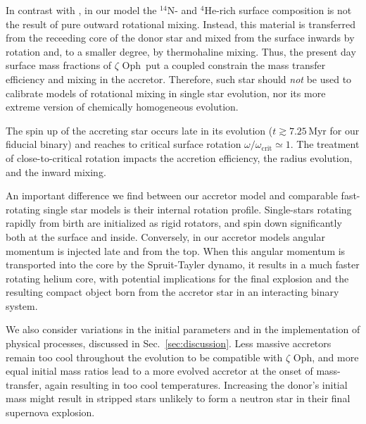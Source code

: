 \documentclass[twocolumn,twocolappendix,trackchanges]{aastex63}
\DeclareRobustCommand{\Secref}[1]{Sec.~\ref{#1}}
\newcommand{\zoph}{$\zeta$ Oph}
\begin{document}
In contrast with \cite{vanrensbergen:96}, in our model the
$^{14}\mathrm{N}$- and $^4\mathrm{He}$-rich surface composition is not
the result of pure outward rotational mixing.  Instead, this material
is transferred from the receeding core of the donor star and mixed
from the surface inwards by rotation and, to a smaller degree, by
thermohaline mixing.  Thus, the present day surface mass fractions of
\zoph\ put a coupled constrain the mass transfer efficiency and mixing
in the accretor. Therefore, such star should \emph{not} be used to
calibrate models of rotational mixing in single star evolution, nor
its more extreme version of chemically homogeneous evolution.

The spin up of the accreting star occurs late in its evolution
($t\gtrsim7.25$\,Myr for our fiducial binary) and
reaches to critical surface rotation
$\omega/\omega_\mathrm{crit}\simeq 1$. %
The treatment of close-to-critical rotation
impacts the accretion efficiency, the radius evolution, and the inward
mixing.

An important difference we find between our accretor model and
comparable fast-rotating single star models is their internal rotation
profile. Single-stars rotating rapidly from birth are initialized as
rigid rotators, and spin down significantly both at the surface and
inside. Conversely, in our accretor models angular momentum is
injected late and from the top. When this angular momentum is
transported into the core by the Spruit-Tayler dynamo, it results in a
much faster rotating helium core, with potential implications for the
final explosion and the resulting compact object born from the
accretor star in an interacting binary system. %


We also consider variations in the initial parameters and in the
implementation of physical processes, discussed in
\Secref{sec:discussion}.  Less massive accretors remain too cool
throughout the evolution to be compatible with \zoph, and more equal
initial mass ratios lead to a more evolved accretor at the onset of
mass-transfer, again resulting in too cool temperatures. Increasing
the donor's initial mass might result in stripped stars unlikely to
form a neutron star in their final supernova explosion.
\end{document}
